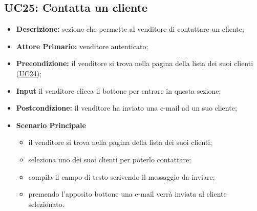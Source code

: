 \subsection{UC25: Contatta un cliente}
\label{sec:UC25}
\begin{itemize}
    \item \textbf{Descrizione:} sezione che permette al venditore di contattare un cliente;
    \item \textbf{Attore Primario:} venditore autenticato;
    \item \textbf{Precondizione:} il venditore si trova nella pagina della lista dei suoi clienti (\hyperref[sec:UC24]{\underline{UC24}});
    \item \textbf{Input} il venditore clicca il bottone per entrare in questa sezione;
    \item \textbf{Postcondizione:} il venditore ha inviato una e-mail ad un suo cliente;
    \item \textbf{Scenario Principale}
          \begin{itemize}
              \item il venditore si trova nella pagina della lista dei suoi clienti;
              \item seleziona uno dei suoi clienti per poterlo contattare;
              \item compila il campo di testo scrivendo il messaggio da inviare;
              \item premendo l'apposito bottone una e-mail verrà inviata al cliente selezionato.
          \end{itemize}
\end{itemize}